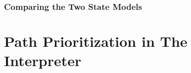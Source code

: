 



\subsubsection{Comparing the Two State Models}




\section{Path Prioritization in The Interpreter}





